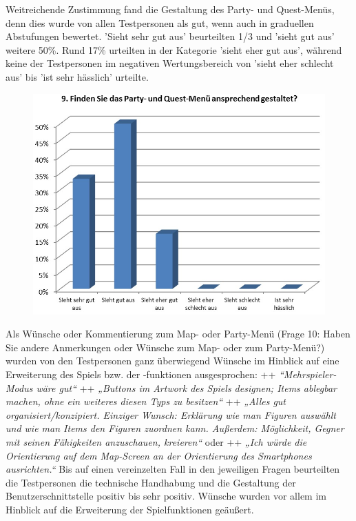 \documentclass[extern,palatino]{cgBA}
\begin{document}
Weitreichende Zustimmung fand die Gestaltung des Party- und Quest-Menüs, denn dies wurde von allen Testpersonen als gut, wenn auch in graduellen Abstufungen bewertet. 'Sieht sehr gut aus' beurteilten 1/3 und 'sieht gut aus'  weitere 50\%. Rund 17\% urteilten in der Kategorie 'sieht eher gut aus', während keine der Testpersonen im negativen Wertungsbereich von 'sieht eher schlecht aus' bis 'ist sehr hässlich'  urteilte.
\begin{figure}[H]
	\centering
	\includegraphics[width=1\textwidth]{table8.jpg}
\end{figure}
Als Wünsche oder Kommentierung zum Map- oder Party-Menü (Frage 10: Haben Sie andere Anmerkungen oder Wünsche zum Map- oder zum Party-Menü?) wurden von den Testpersonen ganz überwiegend Wünsche im Hinblick auf eine Erweiterung des Spiels bzw. der -funktionen ausgesprochen: ++ \textit{“Mehrspieler-Modus wäre gut“}  ++ \textit{„Buttons im Artwork des Spiels designen; Items ablegbar machen, ohne ein weiteres diesen Typs zu besitzen“} ++ \textit{„Alles gut organisiert/konzipiert. Einziger Wunsch: Erklärung wie man Figuren auswählt und wie man Items den Figuren zuordnen kann. Außerdem: Möglichkeit, Gegner mit seinen Fähigkeiten anzuschauen, kreieren“} oder ++ \textit{„Ich würde die Orientierung auf dem Map-Screen an der Orientierung des Smartphones ausrichten.“}
Bis auf einen vereinzelten Fall in den jeweiligen Fragen beurteilten die Testpersonen die technische Handhabung und die Gestaltung der Benutzerschnittstelle positiv bis sehr positiv. Wünsche wurden vor allem im Hinblick auf die Erweiterung der Spielfunktionen geäußert.
\end{document}
